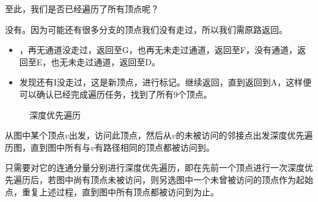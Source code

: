 \begin{frame}\ft{\subsubsecname}
  \begin{wenti}
    至此，我们是否已经遍历了所有顶点呢？
  \end{wenti}
  没有。因为可能还有很多分支的顶点我们没有走过，所以我们需原路返回。

\end{frame}


\begin{frame}\ft{\subsubsecname}
  \begin{itemize}
  \item {}，再无通道没走过，返回至G，也再无未走过通道，返回至F，没有通道，返回至E，也无未走过通道，返回至D。\\[0.1in]%
  \item \tf 发现还有I没走过，这是新顶点，进行标记。继续返回，直到返回到A，这样便可以确认已经完成遍历任务，找到了所有9个顶点。
  \end{itemize}
\end{frame}

\begin{frame}\ft{\subsubsecname}
  \begin{figure}
    \centering
    
    \caption{深度优先遍历}    
  \end{figure}
\end{frame}

\begin{frame}\ft{\subsubsecname}
  \begin{dingyi}[连通图的深度优先遍历]
    从图中某个顶点$v$出发，访问此顶点，然后从$v$的未被访问的邻接点出发深度优先遍历图，直到图中所有与$v$有路径相同的顶点都被访问到。
  \end{dingyi}
\end{frame}

\begin{frame}\ft{\subsubsecname}
  \begin{dingyi}[非连通图的深度优先遍历]
    只需要对它的连通分量分别进行深度优先遍历，即在先前一个顶点进行一次深度优先遍历后，若图中尚有顶点未被访问，则另选图中一个未曾被访问的顶点作为起始点，重复上述过程，直到图中所有顶点都被访问到为止。
  \end{dingyi}
\end{frame}

\begin{frame}\ft{\subsecname}
  
\end{frame}

